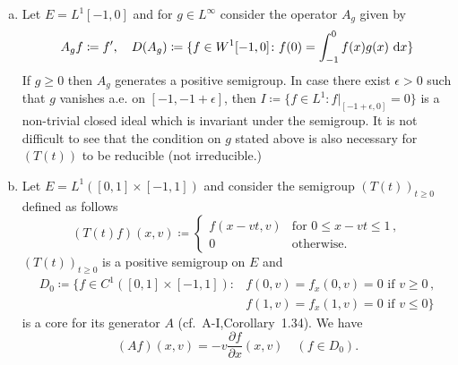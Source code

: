\begin{examples}
\begin{enumerate}[(a), wide]
	\item 
	Let $E = L^{1}[-1,0]$ and for $g \in L^{\infty}$ consider the operator $A_{g}$ given by
	\begin{equation}\label{eq:c3-3.2}
		A_{g}f \coloneqq f', \quad D(A_{g}) \coloneqq \{f \in W^{1}[-1,0] \colon f(0) = \int_{-1}^{0} f(x)g(x)\,\mathop{}\!\mathrm{d}{x}\}
	\end{equation}
	If $g \geq 0$ then $A_{g}$ generates a positive semigroup.
	In case there exist $\epsilon > 0$ such that $g$ vanishes a.e. on $[-1,-1+\epsilon]$, then $I \coloneqq \{f \in L^{1} \colon f|_{[-1+\epsilon,0]} = 0\}$ is a non-trivial closed ideal which is invariant under the semigroup.
	It is not difficult to see that the condition on $g$ stated above is also necessary for $(T(t))$ to be reducible (\ie  not irreducible.)
%
	\item 
	Let $E = L^{1}([0,1]\times[-1,1])$ and consider the semigroup $(T(t))_{t\geq 0}$ defined as follows
	\begin{equation}\label{eq:c3-3.3}
		(T(t)f)(x,v) \coloneqq \begin{cases}
			f(x-vt,v) & \text{for } 0 \leq x-vt \leq 1 \,,\\
			0 & \text{otherwise}.
		\end{cases}
	\end{equation}
		$(T(t))_{t\geq 0}$ is a positive semigroup on $E$ and
	\begin{align*}\label{eq:c3-D0}
		D_{0} \coloneqq \{f \in C^{1}([0,1]\times[-1,1]) \colon  
		& f(0,v) = f_{x}(0,v) = 0 \text{ if } v \geq 0\,,\\ 
		& f(1,v) = f_{x}(1,v) = 0 \text{ if } v \leq 0\}
	\end{align*}
	is a core for its generator $A$ (cf.\ A-I,Corollary~1.34).
	We have
	\begin{equation}\label{eq:c3-3.4}
		(Af)(x,v) = -v\frac{\partial f}{\partial x}(x,v) \quad (f \in D_{0}).
	\end{equation}
	

\end{enumerate}
\end{examples}
